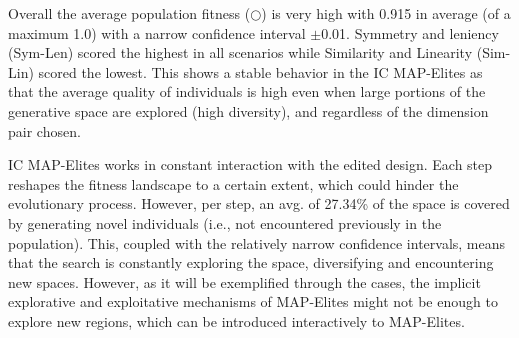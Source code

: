 Overall the average population fitness ($\bigcirc$) is very high with 0.915 in average (of a maximum 1.0) with a narrow confidence interval $\pm$0.01. Symmetry and leniency (Sym-Len) scored the highest in all scenarios while Similarity and Linearity (Sim-Lin) scored the lowest. This shows a stable behavior in the IC MAP-Elites as that the average quality of individuals is high even when large portions of the generative space are explored (high diversity), and regardless of the dimension pair chosen. 


IC MAP-Elites works in constant interaction with the edited design. Each step reshapes the fitness landscape to a certain extent, which could hinder the evolutionary process. However, per step, an avg. of 27.34\% of the space is covered by generating novel individuals (i.e., not encountered previously in the population). This, coupled with the relatively narrow confidence intervals, means that the search is constantly exploring the space, diversifying and encountering new spaces. However, as it will be exemplified through the cases, the implicit explorative and exploitative mechanisms of MAP-Elites might not be enough to explore new regions, which can be introduced interactively to MAP-Elites.


